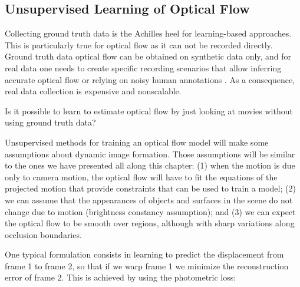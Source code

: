 





\subsection{Unsupervised Learning of Optical Flow}

Collecting ground truth data is the Achilles heel for learning-based approaches. This is particularly true for optical flow as it can not be recorded directly. Ground truth data optical flow can be obtained on synthetic data only, and for real data one needs to create specific recording scenarios that allow inferring accurate optical flow or relying on noisy human annotations \cite{Liu2008}. As a consequence, real data collection is expensive and nonscalable.

Is it possible to learn to estimate optical flow by just looking at movies without using ground truth data?

Unsupervised methods for training an optical flow model will make some assumptions about dynamic image formation. Those assumptions will be similar to the ones we have presented all along this chapter: (1) when the motion is due only to camera motion, the optical flow will have to fit the equations of the projected motion that provide constraints that can be used to train a model; (2) we can assume that the appearances of objects and surfaces in the scene do not change due to motion (brightness constancy assumption); and (3) we can expect the optical flow to be smooth over regions, although with sharp variations along occlusion boundaries.

One typical formulation consists in learning to predict the displacement from frame 1 to frame 2, so that if we warp frame 1 we minimize the reconstruction error of frame 2. This is achieved by using the photometric loss:

